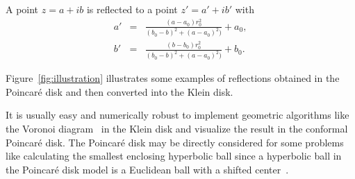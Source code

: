 \documentclass{article}
\begin{document}





A point $z=a+ib$ is reflected to a point $z'=a'+ib'$ with
\begin{eqnarray*}
a' &=& \frac{(a-a_0)r_0^2}{(b_0-b)^2+(a-a_0)^2)}+a_0,\\
b' &=& \frac{(b-b_0)r_0^2}{(b_0-b)^2+(a-a_0)^2)}+b_0.
\end{eqnarray*}

 Figure~\ref{fig:illustration} illustrates some examples of reflections obtained in the Poincar\'e disk and then converted into the Klein disk.




It is usually easy and numerically robust to implement geometric algorithms like the Voronoi diagram~\cite{nielsen2010hyperbolic} in the Klein disk and visualize the result in the conformal Poincar\'e disk.
The Poincar\'e disk may be directly considered for some problems like calculating the smallest enclosing hyperbolic ball since a hyperbolic ball in the Poincar\'e disk model is a Euclidean ball with a shifted center~\cite{tanuma2010revisiting}.
\end{document}
